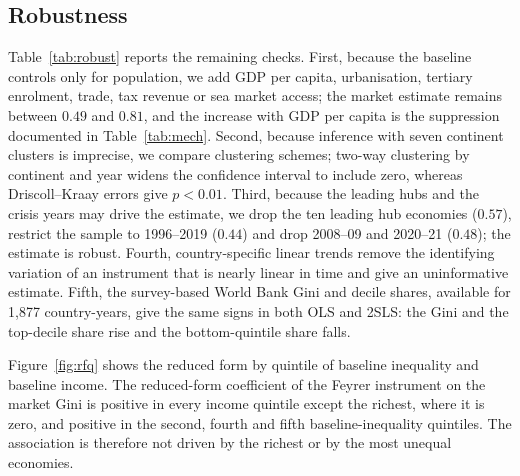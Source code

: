 \subsection{Robustness}
Table~\ref{tab:robust} reports the remaining checks. First, because the baseline controls only for population, we add GDP per capita, urbanisation, tertiary enrolment, trade, tax revenue or sea market access; the market estimate remains between $0.49$ and $0.81$, and the increase with GDP per capita is the suppression documented in Table~\ref{tab:mech}. Second, because inference with seven continent clusters is imprecise, we compare clustering schemes; two-way clustering by continent and year widens the confidence interval to include zero, whereas Driscoll--Kraay errors give $p<0.01$. Third, because the leading hubs and the crisis years may drive the estimate, we drop the ten leading hub economies ($0.57$), restrict the sample to 1996--2019 ($0.44$) and drop 2008--09 and 2020--21 ($0.48$); the estimate is robust. Fourth, country-specific linear trends remove the identifying variation of an instrument that is nearly linear in time and give an uninformative estimate. Fifth, the survey-based World Bank Gini and decile shares, available for 1,877 country-years, give the same signs in both OLS and 2SLS: the Gini and the top-decile share rise and the bottom-quintile share falls.

Figure~\ref{fig:rfq} shows the reduced form by quintile of baseline inequality and baseline income. The reduced-form coefficient of the Feyrer instrument on the market Gini is positive in every income quintile except the richest, where it is zero, and positive in the second, fourth and fifth baseline-inequality quintiles. The association is therefore not driven by the richest or by the most unequal economies.

